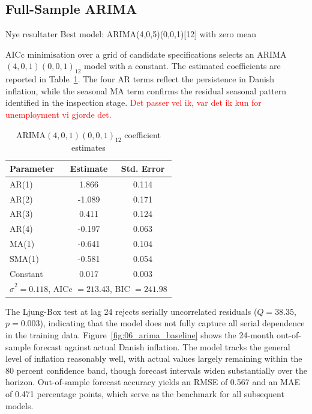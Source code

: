 \subsection{Full-Sample ARIMA}




Nye resultater Best model: ARIMA(4,0,5)(0,0,1)[12] with zero mean  


AICc minimisation over a grid of candidate specifications selects an ARIMA$(4,0,1)(0,0,1)_{12}$ model with a constant. The estimated coefficients  are reported in Table~\ref{tab:arima_coef}. The four AR terms reflect the  persistence in Danish inflation, while the seasonal MA term confirms the residual seasonal pattern identified in the inspection stage. \textcolor{red}{Det passer vel ik, var det ik kun for unemployment vi gjorde det.} 



\begin{table}[H]
\centering
\caption{ARIMA$(4,0,1)(0,0,1)_{12}$ coefficient estimates}
\begin{tabular}{lcc}
\hline
Parameter & Estimate & Std. Error \\
\hline
AR(1)    &  1.866 & 0.114 \\
AR(2)    & -1.089 & 0.171 \\
AR(3)    &  0.411 & 0.124 \\
AR(4)    & -0.197 & 0.063 \\
MA(1)    & -0.641 & 0.104 \\
SMA(1)   & -0.581 & 0.054 \\
Constant &  0.017 & 0.003 \\
\hline
\multicolumn{3}{l}{$\hat{\sigma}^2 = 0.118$, AICc $= 213.43$, BIC $= 241.98$} \\
\hline
\end{tabular}
\label{tab:arima_coef}
\end{table}

The Ljung-Box test at lag 24 rejects serially uncorrelated residuals 
($Q = 38.35$, $p = 0.003$), indicating that the model does not fully capture 
all serial dependence in the training data. Figure~\ref{fig:06_arima_baseline} 
shows the 24-month out-of-sample forecast against actual Danish inflation. 
The model tracks the general level of inflation reasonably well, with actual 
values largely remaining within the 80 percent confidence band, though forecast 
intervals widen substantially over the horizon. Out-of-sample forecast accuracy 
yields an RMSE of 0.567 and an MAE of 0.471 percentage points, which serve as 
the benchmark for all subsequent models.

